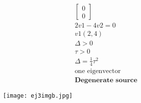 \documentclass[a4paper,10pt]{article}
\begin{document}
\begin{enumerate}
\begin{enumerate}
\begin{equation}
\begin{aligned}
                        \begin{bmatrix}
                            0\\
                            0
                        \end{bmatrix}\\
                        2v1-4v2=0\\
                        v1(2,4)\\
                        \Delta>0\\
                        \tau>0\\
                        \Delta =\frac{1}{4}\tau^{2}\\
                        \text{one eigenvector}\\
                        \textbf{Degenerate source}
                    \end{aligned}
                \end{equation}
                \newpage
                \begin{figure}[h]
                    \centering
                    \texttt{[image: ej3imgb.jpg]}
                    \label{fig:mesh1}
                \end{figure}
                

\end{enumerate}
\end{enumerate}
\end{document}
